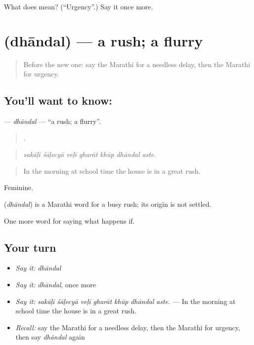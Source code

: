 \begin{tcolorbox}[breakable,colback=teal!4,colframe=teal!35!black,title={Before you move on}]
What does  mean? (\textquotedblleft{}Urgency\textquotedblright{}.) Say it once more.
\end{tcolorbox}
\section[\texorpdfstring{\mr{धांदल} (dhāndal)}{धांदल (dhāndal)}]{ (dhāndal) — a rush; a flurry}

\label{lesson:MR-C555-dhandal}



\begin{quote}
Before the new one: say the Marathi for a needless delay, then the Marathi for urgency.
\end{quote}

\subsection*{You'll want to know: }
\textbf{} — \emph{dhāndal} — \textquotedblleft{}a rush; a flurry\textquotedblright{}.

\begin{quote}
      .
\end{quote}

\begin{quote}
\emph{sakāḷī śāḷecyā veḷī gharāt khūp dhāndal aste.}
\end{quote}

\begin{quote}
In the morning at school time the house is in a great rush.
\end{quote}

Feminine.

\begin{cousinweb}
\textbf{} (\emph{dhāndal}) is a Marathi word for a busy rush; its origin is not settled.
\end{cousinweb}

\begin{grammarlens}[title={What you've built}]
One more word for saying what happens if.
\end{grammarlens}

\subsection*{Your turn}
\begin{itemize}
\raggedright
  \item \emph{Say it:} \emph{dhāndal}
  \item \emph{Say it:} \emph{dhāndal}, once more
  \item \emph{Say it:} \emph{sakāḷī śāḷecyā veḷī gharāt khūp dhāndal aste.} — In the morning at school time the house is in a great rush.
  \item \emph{Recall:} say the Marathi for a needless delay, then the Marathi for urgency, then say \emph{dhāndal} again
\end{itemize}

